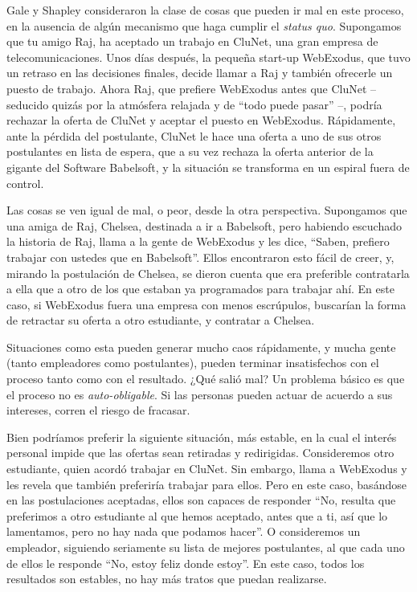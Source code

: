 \documentclass[a4paper, 12pt]{book}
\theoremstyle{dotless}
\begin{document}
Gale y Shapley consideraron la clase de cosas que pueden ir mal en este proceso, en la ausencia de algún mecanismo que haga cumplir el \textit{status quo}. Supongamos que tu amigo Raj, ha aceptado un trabajo en CluNet, una gran empresa de telecomunicaciones. Unos días después, la pequeña start-up WebExodus, que tuvo un retraso en las decisiones finales, decide llamar a Raj y también ofrecerle un puesto de trabajo. Ahora Raj, que prefiere WebExodus antes que CluNet -- seducido quizás por la atmósfera relajada y de ``todo puede pasar'' --, podría rechazar la oferta de CluNet y aceptar el puesto en WebExodus. Rápidamente, ante la pérdida del postulante, CluNet le hace una oferta a uno de sus otros postulantes en lista de espera, que a su vez rechaza la oferta anterior de la gigante del Software Babelsoft, y la situación se transforma en un espiral fuera de control.

Las cosas se ven igual de mal, o peor, desde la otra perspectiva. Supongamos que una amiga de Raj, Chelsea, destinada a ir a Babelsoft, pero habiendo escuchado la historia de Raj, llama a la gente de WebExodus y les dice, ``Saben, prefiero trabajar con ustedes que en Babelsoft''. Ellos encontraron esto fácil de creer, y, mirando la postulación de Chelsea, se dieron cuenta que era preferible contratarla a ella que a otro de los que estaban ya programados para trabajar ahí. En este caso, si WebExodus fuera una empresa con menos escrúpulos, buscarían la forma de retractar su oferta a otro estudiante, y contratar a Chelsea.

Situaciones como esta pueden generar mucho caos rápidamente, y mucha gente (tanto empleadores como postulantes), pueden terminar insatisfechos con el proceso tanto como con el resultado. ¿Qué salió mal? Un problema básico es que el proceso no es \textit{auto-obligable}. Si las personas pueden actuar de acuerdo a sus intereses, corren el riesgo de fracasar.

Bien podríamos preferir la siguiente situación, más estable, en la cual el interés personal impide que las ofertas sean retiradas y redirigidas. Consideremos otro estudiante, quien acordó trabajar en CluNet. Sin embargo, llama a WebExodus y les revela que también preferiría trabajar para ellos.	Pero en este caso, basándose en las postulaciones aceptadas, ellos son capaces de responder ``No, resulta que preferimos a otro estudiante al que hemos aceptado, antes que a ti, así que lo lamentamos, pero no hay nada que podamos hacer''. O consideremos un empleador, siguiendo seriamente su lista de mejores postulantes, al que cada uno de ellos le responde ``No, estoy feliz donde estoy''. En este caso, todos los resultados son estables, no hay más tratos que puedan realizarse.
\end{document}

